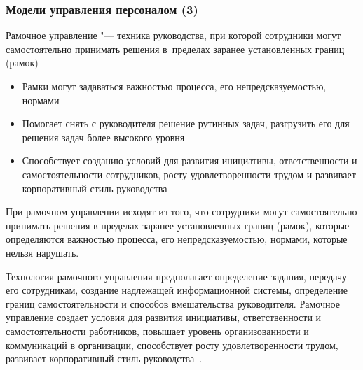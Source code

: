 \documentclass{../industrial-development}
\begin{document}
	\begin{frame} \frametitle{Модели управления персоналом (3)}
		\alert{Рамочное управление} "--- техника руководства, при которой
		сотрудники могут самостоятельно принимать решения в~пределах заранее установленных границ (рамок)
		\begin{itemize}
			\item Рамки могут задаваться важностью процесса, его непредсказуемостью, нормами
			\item Помогает снять с руководителя решение рутинных задач, разгрузить его для решения задач более высокого уровня
			\item Способствует созданию условий для развития инициативы, ответственности и самостоятельности сотрудников, росту удовлетворенности трудом и развивает корпоративный стиль руководства 
		\end{itemize}
	\end{frame}
	
	\lecturenotes
	
	При рамочном управлении исходят из того, что сотрудники могут самостоятельно принимать решения в пределах заранее установленных границ (рамок), которые определяются важностью процесса, его непредсказуемостью, нормами, которые нельзя нарушать.
	
	Технология рамочного управления предполагает определение задания, передачу его сотрудникам, создание надлежащей информационной системы, определение границ самостоятельности и способов вмешательства руководителя. Рамочное управление создает условия для развития инициативы, ответственности и самостоятельности работников, повышает уровень организованности и коммуникаций в организации, способствует росту удовлетворенности трудом, развивает корпоративный стиль руководства~\cite{Porshnev}. 
	
\end{document}

